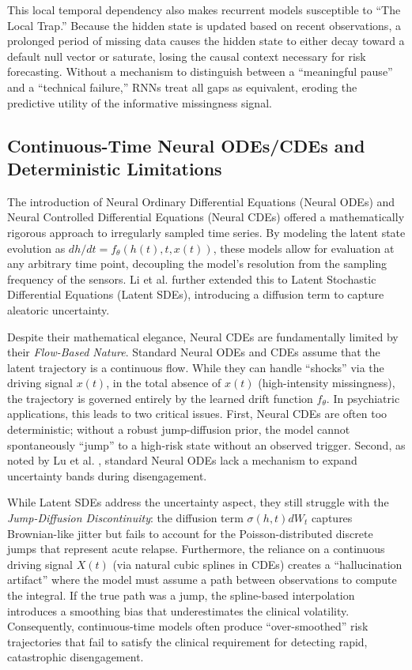 This local temporal dependency also makes recurrent models susceptible to ``The Local Trap.'' Because the hidden state is updated based on recent observations, a prolonged period of missing data causes the hidden state to either decay toward a default null vector or saturate, losing the causal context necessary for risk forecasting. Without a mechanism to distinguish between a ``meaningful pause'' and a ``technical failure,'' RNNs treat all gaps as equivalent, eroding the predictive utility of the informative missingness signal.

\subsection{Continuous-Time Neural ODEs/CDEs and Deterministic Limitations}

The introduction of Neural Ordinary Differential Equations (Neural ODEs) \cite{chen2018neuralode} and Neural Controlled Differential Equations (Neural CDEs) \cite{kidger2020neural} offered a mathematically rigorous approach to irregularly sampled time series. By modeling the latent state evolution as $dh/dt = f_{\theta}(h(t), t, x(t))$, these models allow for evaluation at any arbitrary time point, decoupling the model's resolution from the sampling frequency of the sensors. Li et al. \cite{li2020scalable} further extended this to Latent Stochastic Differential Equations (Latent SDEs), introducing a diffusion term to capture aleatoric uncertainty.

Despite their mathematical elegance, Neural CDEs are fundamentally limited by their \textit{Flow-Based Nature}. Standard Neural ODEs and CDEs assume that the latent trajectory is a continuous flow. While they can handle ``shocks'' via the driving signal $x(t)$, in the total absence of $x(t)$ (high-intensity missingness), the trajectory is governed entirely by the learned drift function $f_{\theta}$. In psychiatric applications, this leads to two critical issues. First, Neural CDEs are often too deterministic; without a robust jump-diffusion prior, the model cannot spontaneously ``jump'' to a high-risk state without an observed trigger. Second, as noted by Lu et al. \cite{lu2026neural_sdes_suicide_risk}, standard Neural ODEs lack a mechanism to expand uncertainty bands during disengagement.

While Latent SDEs address the uncertainty aspect, they still struggle with the \textit{Jump-Diffusion Discontinuity}: the diffusion term $\sigma(h, t)dW_t$ captures Brownian-like jitter but fails to account for the Poisson-distributed discrete jumps that represent acute relapse. Furthermore, the reliance on a continuous driving signal $X(t)$ (via natural cubic splines in CDEs) creates a ``hallucination artifact'' where the model must assume a path between observations to compute the integral. If the true path was a jump, the spline-based interpolation introduces a smoothing bias that underestimates the clinical volatility. Consequently, continuous-time models often produce ``over-smoothed'' risk trajectories that fail to satisfy the clinical requirement for detecting rapid, catastrophic disengagement.

